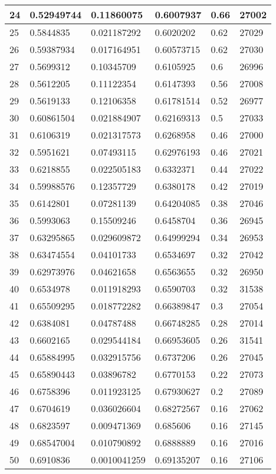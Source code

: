 \begin{longtable}{|l|l|l|l|l|l|}
24 & 0.52949744 & 0.11860075 & 0.6007937 & 0.66 & 27002 \\ \hline 
25 & 0.5844835 & 0.021187292 & 0.6020202 & 0.62 & 27029 \\ \hline 
26 & 0.59387934 & 0.017164951 & 0.60573715 & 0.62 & 27030 \\ \hline 
27 & 0.5699312 & 0.10345709 & 0.6105925 & 0.6 & 26996 \\ \hline 
28 & 0.5612205 & 0.11122354 & 0.6147393 & 0.56 & 27008 \\ \hline 
29 & 0.5619133 & 0.12106358 & 0.61781514 & 0.52 & 26977 \\ \hline 
30 & 0.60861504 & 0.021884907 & 0.62169313 & 0.5 & 27033 \\ \hline 
31 & 0.6106319 & 0.021317573 & 0.6268958 & 0.46 & 27000 \\ \hline 
32 & 0.5951621 & 0.07493115 & 0.62976193 & 0.46 & 27021 \\ \hline 
33 & 0.6218855 & 0.022505183 & 0.6332371 & 0.44 & 27022 \\ \hline 
34 & 0.59988576 & 0.12357729 & 0.6380178 & 0.42 & 27019 \\ \hline 
35 & 0.6142801 & 0.07281139 & 0.64204085 & 0.38 & 27046 \\ \hline 
36 & 0.5993063 & 0.15509246 & 0.6458704 & 0.36 & 26945 \\ \hline 
37 & 0.63295865 & 0.029609872 & 0.64999294 & 0.34 & 26953 \\ \hline 
38 & 0.63474554 & 0.04101733 & 0.6534697 & 0.32 & 27042 \\ \hline 
39 & 0.62973976 & 0.04621658 & 0.6563655 & 0.32 & 26950 \\ \hline 
40 & 0.6534978 & 0.011918293 & 0.6590703 & 0.32 & 31538 \\ \hline 
41 & 0.65509295 & 0.018772282 & 0.66389847 & 0.3 & 27054 \\ \hline 
42 & 0.6384081 & 0.04787488 & 0.66748285 & 0.28 & 27014 \\ \hline 
43 & 0.6602165 & 0.029544184 & 0.66953605 & 0.26 & 31541 \\ \hline 
44 & 0.65884995 & 0.032915756 & 0.6737206 & 0.26 & 27045 \\ \hline 
45 & 0.65890443 & 0.03896782 & 0.6770153 & 0.22 & 27073 \\ \hline 
46 & 0.6758396 & 0.011923125 & 0.67930627 & 0.2 & 27089 \\ \hline 
47 & 0.6704619 & 0.036026604 & 0.68272567 & 0.16 & 27062 \\ \hline 
48 & 0.6823597 & 0.009471369 & 0.685606 & 0.16 & 27145 \\ \hline 
49 & 0.68547004 & 0.010790892 & 0.6888889 & 0.16 & 27016 \\ \hline 
50 & 0.6910836 & 0.0010041259 & 0.69135207 & 0.16 & 27106 \\ \hline 
\end{longtable}